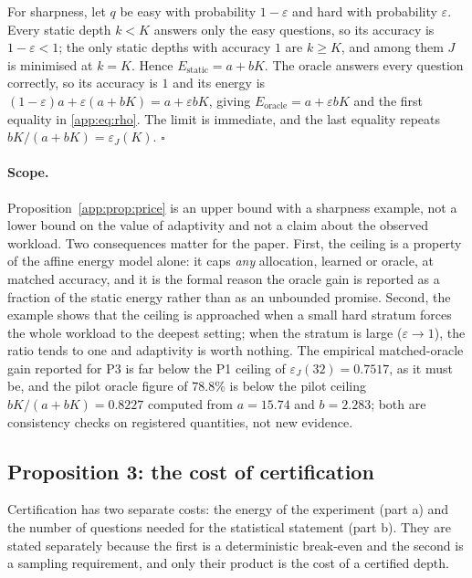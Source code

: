 For sharpness, let $q$ be easy with probability $1-\varepsilon$ and hard with
probability $\varepsilon$. Every static depth $k<K$ answers only the easy
questions, so its accuracy is $1-\varepsilon<1$; the only static depths with
accuracy $1$ are $k\ge K$, and among them $J$ is minimised at $k=K$. Hence
$E_{\mathrm{static}}=a+bK$. The oracle answers every question correctly, so its
accuracy is $1$ and its energy is
$(1-\varepsilon)a+\varepsilon(a+bK)=a+\varepsilon bK$, giving
$E_{\mathrm{oracle}}=a+\varepsilon bK$ and the first equality in
\eqref{app:eq:rho}. The limit is immediate, and the last equality repeats
$bK/(a+bK)=\varepsilon_{J}(K)$. \hfill$\square$

\paragraph{Scope.} Proposition~\ref{app:prop:price} is an upper bound with a
sharpness example, not a lower bound on the value of adaptivity and not a claim
about the observed workload. Two consequences matter for the paper. First, the
ceiling is a property of the affine energy model alone: it caps \emph{any}
allocation, learned or oracle, at matched accuracy, and it is the formal reason
the oracle gain is reported as a fraction of the static energy rather than as an
unbounded promise. Second, the example shows that the ceiling is approached when
a small hard stratum forces the whole workload to the deepest setting; when the
stratum is large ($\varepsilon\to1$), the ratio tends to one and adaptivity is
worth nothing. The empirical matched-oracle gain reported for P3 is far below the
P1 ceiling of $\varepsilon_{J}(32)=0.7517$, as it must be, and the pilot oracle
figure of $78.8\%$ is below the pilot ceiling
$bK/(a+bK)=0.8227$ computed from $a=15.74$ and $b=2.283$; both are consistency
checks on registered quantities, not new evidence.

\subsection{Proposition 3: the cost of certification}\label{app:prop:cert}

Certification has two separate costs: the energy of the experiment (part a) and
the number of questions needed for the statistical statement (part b). They are
stated separately because the first is a deterministic break-even and the second
is a sampling requirement, and only their product is the cost of a certified
depth.

